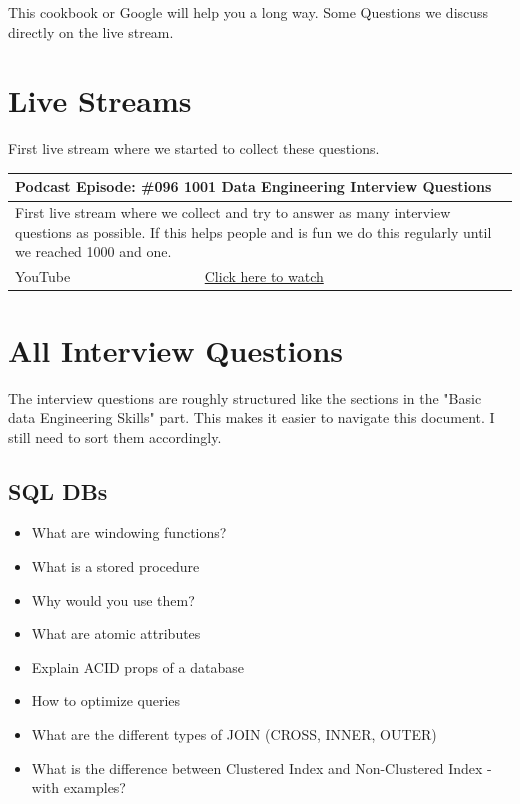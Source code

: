 \documentclass[12pt, numbers=noenddot]{scrreprt} %
\begin{document}
This cookbook or Google will help you a long way. Some Questions we discuss directly on the live stream.

\chapter{Live Streams}

First live stream where we started to collect these questions. 

\begin{table}[h]
\begin{tabular}{ll}
\hline
\multicolumn{2}{l}{\textbf{Podcast Episode:} \#096 1001 Data Engineering Interview Questions} \\ \hline
\multicolumn{2}{p{15cm}}{First live stream where we collect and try to answer as many interview questions as possible. If this helps people and is fun we do this regularly until we reached 1000 and one.}         \\ \hline
\multicolumn{1}{l|}{YouTube}   & \href{https://youtu.be/WbqRH2r3N40}{Click here to watch}   \\  \hline
\end{tabular}
\end{table}


\chapter{All Interview Questions}

The interview questions are roughly structured like the sections in the "Basic data Engineering Skills" part.
This makes it easier to navigate this document. I still need to sort them accordingly.

\section*{SQL DBs}

\begin{itemize}
\item What are windowing functions?
\item What is a stored procedure
\item Why would you use them?
\item What are atomic attributes
\item Explain ACID props of a database
\item How to optimize queries
\item What are the different types of JOIN (CROSS, INNER, OUTER)
\item What is the difference between Clustered Index and Non-Clustered Index - with examples?
\end{itemize}
\end{document}
